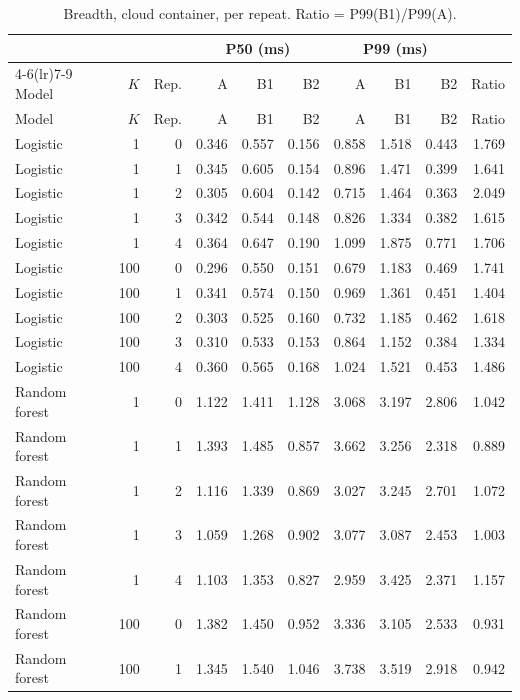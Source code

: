 \documentclass[10pt,a4paper]{article}
\begin{document}
\begin{longtable}{lrrrrrrrrr}
\caption{Breadth, cloud container, per repeat. Ratio = P99(B1)/P99(A).}\label{tab:cloud_rep}\\
\toprule
 & & & \multicolumn{3}{c}{P50 (ms)} & \multicolumn{3}{c}{P99 (ms)} & \\
\cmidrule(lr){4-6}\cmidrule(lr){7-9}
Model & $K$ & Rep. & A & B1 & B2 & A & B1 & B2 & Ratio \\
\midrule
\endfirsthead
\toprule
Model & $K$ & Rep. & A & B1 & B2 & A & B1 & B2 & Ratio \\
\midrule
\endhead
Logistic & 1 & 0 & 0.346 & 0.557 & 0.156 & 0.858 & 1.518 & 0.443 & 1.769 \\
Logistic & 1 & 1 & 0.345 & 0.605 & 0.154 & 0.896 & 1.471 & 0.399 & 1.641 \\
Logistic & 1 & 2 & 0.305 & 0.604 & 0.142 & 0.715 & 1.464 & 0.363 & 2.049 \\
Logistic & 1 & 3 & 0.342 & 0.544 & 0.148 & 0.826 & 1.334 & 0.382 & 1.615 \\
Logistic & 1 & 4 & 0.364 & 0.647 & 0.190 & 1.099 & 1.875 & 0.771 & 1.706 \\
Logistic & 100 & 0 & 0.296 & 0.550 & 0.151 & 0.679 & 1.183 & 0.469 & 1.741 \\
Logistic & 100 & 1 & 0.341 & 0.574 & 0.150 & 0.969 & 1.361 & 0.451 & 1.404 \\
Logistic & 100 & 2 & 0.303 & 0.525 & 0.160 & 0.732 & 1.185 & 0.462 & 1.618 \\
Logistic & 100 & 3 & 0.310 & 0.533 & 0.153 & 0.864 & 1.152 & 0.384 & 1.334 \\
Logistic & 100 & 4 & 0.360 & 0.565 & 0.168 & 1.024 & 1.521 & 0.453 & 1.486 \\
Random forest & 1 & 0 & 1.122 & 1.411 & 1.128 & 3.068 & 3.197 & 2.806 & 1.042 \\
Random forest & 1 & 1 & 1.393 & 1.485 & 0.857 & 3.662 & 3.256 & 2.318 & 0.889 \\
Random forest & 1 & 2 & 1.116 & 1.339 & 0.869 & 3.027 & 3.245 & 2.701 & 1.072 \\
Random forest & 1 & 3 & 1.059 & 1.268 & 0.902 & 3.077 & 3.087 & 2.453 & 1.003 \\
Random forest & 1 & 4 & 1.103 & 1.353 & 0.827 & 2.959 & 3.425 & 2.371 & 1.157 \\
Random forest & 100 & 0 & 1.382 & 1.450 & 0.952 & 3.336 & 3.105 & 2.533 & 0.931 \\
Random forest & 100 & 1 & 1.345 & 1.540 & 1.046 & 3.738 & 3.519 & 2.918 & 0.942 \\

\end{longtable}
\end{document}
